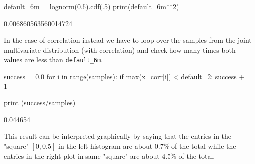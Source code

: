 \begin{ipython}
default_6m = lognorm(0.5).cdf(.5)
print(default_6m**2)

0.006860563560014724
\end{ipython}

In the case of correlation instead we have to loop over the samples from the joint multivariate distribution (with correlation) and check how many times both values are less than \texttt{default\_6m}.

\begin{ipython}
success = 0.0
for i in range(samples):
    if max(x_corr[i]) < default_2:
        success += 1

print (success/samples)

0.044654
\end{ipython}

This result can be interpreted graphically by saying that the entries in the "square" $[0, 0.5]$ in the left histogram are about 0.7\% of the total while the entries in the right plot in same "square" are about 4.5\% of the total. 

